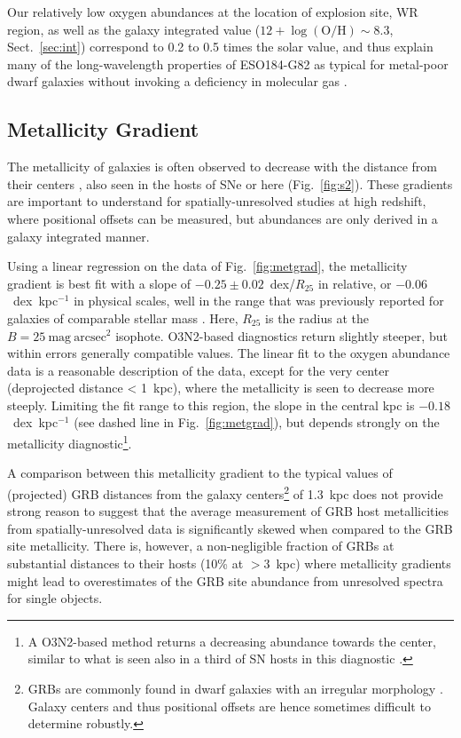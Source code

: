 \documentclass[traditabstract, referee]{aa}
\newcommand{\oh}{12+\log(\mathrm{O/H})}
\begin{document}
Our relatively low oxygen abundances at the location of explosion site, WR region, as well as the galaxy integrated value ($\oh\sim8.3$, Sect.~\ref{sec:int}) correspond to 0.2 to 0.5 times the solar value, and thus explain many of the long-wavelength properties of ESO184-G82 as typical for metal-poor dwarf galaxies without invoking a deficiency in molecular gas \citep{2016arXiv160901742M}.

\subsection{Metallicity Gradient}
\label{sec:metgrad}

The metallicity of galaxies is often observed to decrease with the distance from their centers \citep[e.g.][]{1994ApJ...420...87Z, 2014A&A...563A..49S}, also seen in the hosts of SNe \citep{2016A&A...591A..48G} or here (Fig.~\ref{fig:s2}). These gradients are important to understand for spatially-unresolved studies at high redshift, where positional offsets can be measured, but abundances are only derived in a galaxy integrated manner. 

Using a linear regression on the data of Fig.~\ref{fig:metgrad}, the metallicity gradient is best fit with a slope of $-0.25\pm0.02$~dex/$R_{25}$ in relative, or $-0.06$~dex~kpc$^{-1}$ in physical scales, well in the range that was previously reported for galaxies of comparable stellar mass \citep{2015MNRAS.448.2030H}. Here, $R_{25}$ is the radius at the $B=25~\mathrm{mag}~\mathrm{arcsec}^2$ isophote. O3N2-based diagnostics return slightly steeper, but within errors generally compatible values. The linear fit to the oxygen abundance data is a reasonable description of the data, except for the very center (deprojected distance < 1~kpc), where the metallicity is seen to decrease more steeply. Limiting the fit range to this region, the slope in the central kpc is $-0.18$~dex~kpc$^{-1}$ (see dashed line in Fig.~\ref{fig:metgrad}), but depends strongly on the metallicity diagnostic\footnote{A O3N2-based method returns a decreasing abundance towards the center, similar to what is seen also in a third of SN hosts in this diagnostic \citep{2016A&A...591A..48G}.}.

A comparison between this metallicity gradient to the typical values of (projected) GRB distances from the galaxy centers\footnote{{GRBs are commonly found in dwarf galaxies with an irregular morphology \citep[e.g.,][]{2006Natur.441..463F, 2017MNRAS.tmp..220L}. Galaxy centers and thus positional offsets are hence sometimes difficult to determine robustly.}} of 1.3~kpc \citep{2016ApJ...817..144B} does not provide strong reason to suggest that the average measurement of GRB host metallicities from spatially-unresolved data is significantly skewed when compared to the GRB site metallicity. There is, however, a non-negligible fraction of GRBs at substantial distances to their hosts (10\% at $>3$~kpc) where metallicity gradients might lead to overestimates of the GRB site abundance from unresolved spectra for single objects.
\end{document}
